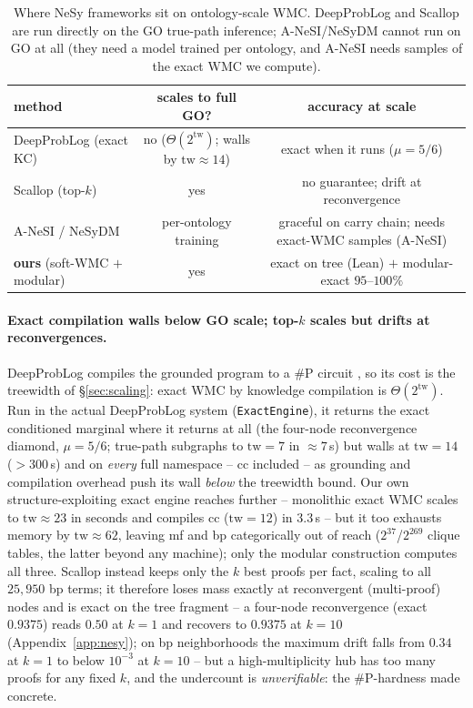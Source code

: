 \documentclass[anon]{nesy2026}
\newcommand{\WMC}{\ensuremath{\mathrm{WMC}}}
\newcommand{\tw}{\ensuremath{\mathrm{tw}}}
\begin{document}
\begin{table}[t]\centering
\caption{Where NeSy frameworks sit on ontology-scale WMC. DeepProbLog and Scallop are run directly on the GO true-path inference; A-NeSI/NeSyDM cannot run on GO at all (they need a model trained per ontology, and A-NeSI needs samples of the exact $\WMC$ we compute).}\label{tab:nesy}
\small
\begin{tabular}{lcc}
\toprule
method & scales to full GO? & accuracy at scale\\
\midrule
DeepProbLog \citep{manhaeve2018deepproblog} (exact KC) & no ($\Theta(2^{\tw})$; walls by $\tw{\approx}14$) & exact when it runs ($\mu{=}5/6$)\\
Scallop \citep{huang2021scallop} (top-$k$) & yes & no guarantee; drift at reconvergence\\
A-NeSI \citep{vankrieken2023anesi} / NeSyDM \citep{vankrieken2025nesydm} & per-ontology training & graceful on carry chain; needs exact-$\WMC$ samples (A-NeSI)\\
\textbf{ours} (soft-WMC $+$ modular) & yes & exact on tree (Lean) $+$ modular-exact $95$--$100\%$\\
\bottomrule
\end{tabular}
\end{table}

\paragraph{Exact compilation walls below GO scale; top-$k$ scales but drifts at reconvergences.}
DeepProbLog compiles the grounded program to a $\#$P circuit \citep{manhaeve2018deepproblog}, so its
cost is the treewidth of \S\ref{sec:scaling}: exact WMC by knowledge compilation is
$\Theta(2^{\tw})$. Run in the actual DeepProbLog system (\texttt{ExactEngine}), it returns the
exact conditioned marginal where it returns at all (the four-node reconvergence diamond, $\mu{=}5/6$;
true-path subgraphs to $\tw{=}7$ in ${\approx}7$\,s) but walls at $\tw{=}14$ ($>300$\,s) and on
\emph{every} full namespace -- cc included -- as grounding and compilation overhead push its wall
\emph{below} the treewidth bound. Our own structure-exploiting exact engine reaches further --
monolithic exact WMC scales to $\tw{\approx}23$ in seconds and compiles cc ($\tw{=}12$) in $3.3$\,s --
but it too exhausts memory by $\tw{\approx}62$, leaving mf and bp categorically out of reach
($2^{37}$/$2^{269}$ clique tables, the latter beyond any machine); only the modular construction
computes all three.
Scallop \citep{huang2021scallop}
instead keeps only the $k$ best proofs per fact, scaling to all $25{,}950$ bp terms; it
therefore loses mass exactly at reconvergent (multi-proof) nodes and is exact on the tree
fragment -- a four-node reconvergence (exact $0.9375$) reads $0.50$ at $k{=}1$ and recovers to
$0.9375$ at $k{=}10$ (Appendix~\ref{app:nesy}); on bp neighborhoods the maximum drift falls from
$0.34$ at $k{=}1$ to below $10^{-3}$ at $k{=}10$ -- but a high-multiplicity hub has too many proofs for
any fixed $k$, and the undercount is \emph{unverifiable}: the $\#$P-hardness made concrete.
\end{document}

